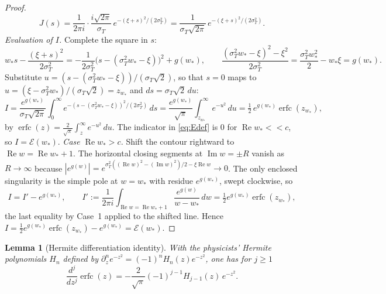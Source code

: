 \documentclass[11pt]{article}
\newtheorem{lemma}[theorem]{Lemma}
\DeclareMathOperator{\Real}{Re}
\DeclareMathOperator{\Imag}{Im}
\DeclareMathOperator{\erfc}{erfc}
\begin{document}
\begin{proof}
\begin{equation}\label{eq:E-J}
J(s)=\frac{1}{2\pi i}\cdot\frac{i\sqrt{2\pi}}{\sigma_T}\,
e^{-(\xi+s)^2/(2\sigma_T^2)}
=\frac{1}{\sigma_T\sqrt{2\pi}}\,e^{-(\xi+s)^2/(2\sigma_T^2)}.
\end{equation}
\emph{Evaluation of $I$.} Complete the square in $s$:
\begin{equation}\label{eq:E-scompl}
w_*s-\frac{(\xi+s)^2}{2\sigma_T^2}
=-\frac{1}{2\sigma_T^2}\bigl(s-(\sigma_T^2w_*-\xi)\bigr)^2+g(w_*),
\qquad
\frac{(\sigma_T^2w_*-\xi)^2-\xi^2}{2\sigma_T^2}
=\frac{\sigma_T^2w_*^2}{2}-w_*\xi=g(w_*).
\end{equation}
Substitute $u=(s-(\sigma_T^2w_*-\xi))/(\sigma_T\sqrt2)$, so that $s=0$ maps
to $u=(\xi-\sigma_T^2w_*)/(\sigma_T\sqrt2)=z_{w_*}$ and $ds=\sigma_T\sqrt2\,
du$:
\begin{equation}\label{eq:E-Ifinal}
I=\frac{e^{g(w_*)}}{\sigma_T\sqrt{2\pi}}\int_0^\infty
e^{-(s-(\sigma_T^2w_*-\xi))^2/(2\sigma_T^2)}\,ds
=\frac{e^{g(w_*)}}{\sqrt\pi}\int_{z_{w_*}}^\infty e^{-u^2}\,du
=\tfrac12\,e^{g(w_*)}\erfc(z_{w_*}),
\end{equation}
by $\erfc(z)=\tfrac{2}{\sqrt\pi}\int_z^\infty e^{-u^2}\,du$. The indicator in
\eqref{eq:Edef} is $0$ for $\Real w_*<<c$, so $I=\mathcal E(w_*)$.
\emph{Case $\Real w_*>c$.} Shift the contour rightward to
$\Real w=\Real w_*+1$. The horizontal closing segments at $\Imag w=\pm R$
vanish as $R\to\infty$ because
$|e^{g(w)}|=e^{\sigma_T^2((\Real w)^2-(\Imag w)^2)/2-\xi\Real w}\to0$. The
only enclosed singularity is the simple pole at $w=w_*$ with residue
$e^{g(w_*)}$, swept clockwise, so
\begin{equation}\label{eq:E-shift}
I=I'-e^{g(w_*)},\qquad
I':=\frac{1}{2\pi i}\int_{\Real w=\Real w_*+1}\frac{e^{g(w)}}{w-w_*}\,dw
=\tfrac12 e^{g(w_*)}\erfc(z_{w_*}),
\end{equation}
the last equality by Case~1 applied to the shifted line. Hence
$I=\tfrac12 e^{g(w_*)}\erfc(z_{w_*})-e^{g(w_*)}=\mathcal E(w_*)$.
\end{proof}

\begin{lemma}[Hermite differentiation identity]\label{lem:hermite}
With the physicists' Hermite polynomials $H_n$ defined by
$\partial_z^n e^{-z^2}=(-1)^n H_n(z)e^{-z^2}$, one has for $j\ge1$
\begin{equation}\label{eq:hermite}
\frac{d^{j}}{dz^{j}}\erfc(z)=-\frac{2}{\sqrt\pi}(-1)^{j-1}H_{j-1}(z)\,
e^{-z^2}.
\end{equation}
\end{lemma}
\end{document}
